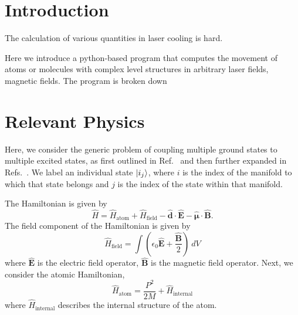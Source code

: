 \documentclass[final,5p,times,twocolumn]{elsarticle}
\begin{document}
\section{Introduction}
\label{sec:intro}
The calculation of various quantities in laser cooling is hard.

Here we introduce a python-based program that computes the movement of atoms or molecules with complex level structures in arbitrary laser fields, magnetic fields.  The program is broken down

\section{Relevant Physics}
Here, we consider the generic problem of coupling multiple ground states to
multiple excited states, as first outlined in Ref.~\cite{Gordon1980} and then
further expanded in Refs.~\cite{Ungar1989,Tarbutt2015,Devlin2016,Devlin2018}.  We label an individual state $\ket{i_j}$, where $i$ is the index of the manifold to which that state belongs and $j$ is the index of the state within that manifold.

The Hamiltonian is given by
\begin{equation}
    \label{eq:obe:generic_hamiltonian}
    \hat{H} = \hat{H}_\text{atom} + \hat{H}_\text{field} -
    \hat{\boldsymbol{d}}\cdot\hat{\mathbf{E}} -
    \hat{\mathbf{\mu}}\cdot\hat{\mathbf{B}}.
\end{equation}
The field component of the Hamiltonian is given by
\begin{equation}
    \label{eq:obe:field}
    \hat{H}_\text{field} = \int \left(\epsilon_0 \hat{\mathbf{E}} +
    \frac{\hat{\mathbf{B}}}{2}\right)\ dV
\end{equation}
where $\hat{\mathbf{E}}$ is the electric field operator, $\hat{\mathbf{B}}$ is
the magnetic field operator.  Next, we consider the atomic Hamiltonian,
\begin{equation}
    \hat{H}_\text{atom} = \frac{P^2}{2M} + \hat{H}_\text{internal}
\end{equation}
where $\hat{H}_\text{internal}$ describes the internal structure of the atom.
\end{document}
